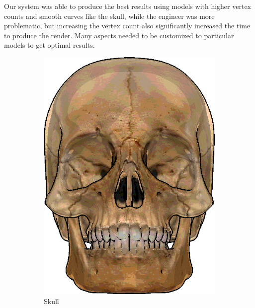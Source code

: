 
Our system was able to produce the best results using models with higher vertex counts and smooth curves like the skull, while the engineer was more problematic, but increasing the vertex count also significantly increased the time to produce the render. Many aspects needed to be customized to particular models to get optimal results.

\begin{figure}[h]
\centering
\begin{subfigure}[b]{0.2\textwidth}
        \includegraphics[width=\textwidth]{img/Combined/FinalSkull.png}
        \caption{Skull}
 		\label{fig:FinalSkull}
\end{subfigure}
~
\hspace{36pt}
~
\begin{subfigure}[b]{0.18\textwidth}

\end{subfigure}
\end{figure}
